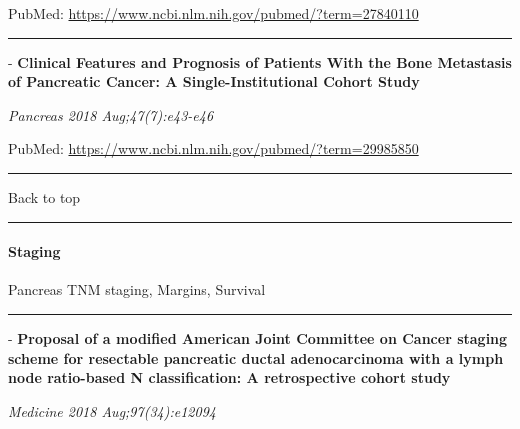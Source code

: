 \documentclass[]{article}
\let\oldparagraph\paragraph
\renewcommand{\paragraph}[1]{\oldparagraph{#1}\mbox{}}
\begin{document}
PubMed: \url{https://www.ncbi.nlm.nih.gov/pubmed/?term=27840110}

{}

{}

\begin{center}\rule{0.5\linewidth}{\linethickness}\end{center}

 - \textbf{Clinical Features and Prognosis of Patients With the Bone
Metastasis of Pancreatic Cancer: A Single-Institutional Cohort Study}

\emph{Pancreas 2018 Aug;47(7):e43-e46}

PubMed: \url{https://www.ncbi.nlm.nih.gov/pubmed/?term=29985850}

{}

{}

\begin{center}\rule{0.5\linewidth}{\linethickness}\end{center}

Back to top

\begin{center}\rule{0.5\linewidth}{\linethickness}\end{center}

\pagebreak

\hypertarget{staging}{%
\paragraph{Staging}\label{staging}}

Pancreas TNM staging, Margins, Survival

\begin{center}\rule{0.5\linewidth}{\linethickness}\end{center}

 - \textbf{Proposal of a modified American Joint Committee on Cancer
staging scheme for resectable pancreatic ductal adenocarcinoma with a
lymph node ratio-based N classification: A retrospective cohort study}

\emph{Medicine 2018 Aug;97(34):e12094}
\end{document}
